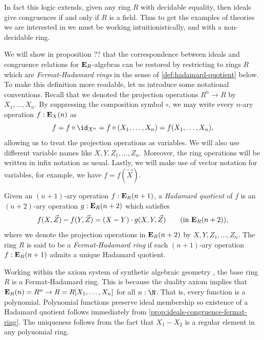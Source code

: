 {\begin{remark}
  In fact this logic extends, given any ring $R$ with decidable equality, then ideals give congruences if and only if $R$ is a field.
  Thus to get the examples of theories we are interested in we must be working intuitionistically, and with a non-decidable ring.
\end{remark}

We will show in proposition ?? that the correspondence between ideals and congruence relations for \(\mathbf{E}_R\)-algebras can be restored by restricting to rings \(R\) which are \emph{Fermat-Hadamard rings} in the sense of \cref{def:hadamard-quotient} below.
To make this definition more readable, let us introduce some notational conventions.
Recall that we denoted the projection operations \(R^n\to R\) by \(X_1,\dots, X_n\).
By suppressing the composition symbol \(\circ\), we may write every \(n\)-ary operation \(f:\mathbf{E}_X(n)\) as
\[
  f = f\circ\id_{X^n} = f \circ (X_1,\dots,X_n) = f(X_1,\dots,X_n),
\]
allowing us to treat the projection operations as variables.
We will also use different variable names like \(X,Y,Z_1,\dots,Z_n\).
Moreover, the ring operations will be written in infix notation as usual.
Lastly, we will make use of vector notation for variables, for example, we have \(f = f(\vec X)\).


\begin{definition}
  \label{def:hadamard-quotient}
  Given an \((n+1)\)-ary operation \(f:\mathbf{E}_R(n+1)\), a \emph{Hadamard quotient} of \(f\) is an \((n+2)\)-ary operation \(g : \mathbf{E}_R(n+2)\) which satisfies
  \[
    f(X,\vec Z) - f(Y,\vec Z) = (X-Y)\cdot g(X,Y,\vec Z) \qquad \text{(in \(\mathbf{E}_R(n+2)\))},
  \]
  where we denote the projection operations in \(\mathbf{E}_R(n+2)\) by \(X,Y,Z_1,\dots,Z_n\).
  The ring \(R\) is said to be a \emph{Fermat-Hadamard ring} if each \((n+1)\)-ary operation \(f:\mathbf{E}_R(n+1)\) admits a unique Hadamard quotient.
\end{definition}

\begin{example}
  Working within the axiom system of synthetic algebraic geometry \cite{draft}, the base ring \(R\) is a Fermat-Hadamard ring.
  This is because the duality axiom implies that \(\mathbf{E}_R(n) = R^n \to R = R[X_1, \ldots, X_n]\) for all \(n : \N\).
  That is, every function is a polynomial.
  Polynomial functions preserve ideal membership so existence of a Hadamard quotient follows immediately from \ref{prop:ideals-congruence-fermat-ring}.
  The uniqueness follows from the fact that \(X_1 - X_2\) is a regular element in any polynomial ring.
\end{example}

}
